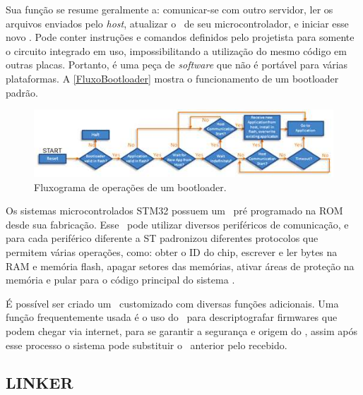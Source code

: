 Sua função se resume geralmente a: comunicar-se com outro servidor, ler os arquivos enviados pelo \textit{host}, atualizar o \firmware\ de seu microcontrolador, e iniciar esse novo \software. 
Pode conter instruções e comandos definidos pelo projetista para somente o circuito integrado em uso, impossibilitando a utilização do mesmo código em outras placas.
Portanto, é uma peça de \textit{software} que não é portável para várias plataformas. A \autoref{FluxoBootloader} mostra o funcionamento de um bootloader padrão. 

\begin{figure}[H]
    \scriptsize
     \centering
     \includegraphics[scale=1]{dados/figuras/FluxoBootloader.jpg}
     \caption{Fluxograma de operações de um bootloader.}
     \label{FluxoBootloader}
\end{figure}



Os sistemas microcontrolados STM32 possuem um \bootloader\ pré programado na ROM desde sua fabricação. Esse \bootloader\ pode utilizar diversos periféricos de comunicação, e para cada periférico diferente a ST padronizou diferentes protocolos que permitem várias operações, como: obter o ID do chip, escrever e ler bytes na RAM e memória flash, apagar setores das memórias, ativar áreas de proteção na memória e pular para o código principal do sistema \cite{Noviello2018}.

É possível ser criado um \bootloader\ customizado com diversas funções adicionais. Uma função frequentemente usada é o uso do \bootloader\ para descriptografar firmwares que podem chegar via internet, para se garantir a segurança e origem do \firmware, assim após esse processo o sistema pode substituir o \software\ anterior pelo recebido. 



\subsection{LINKER}

